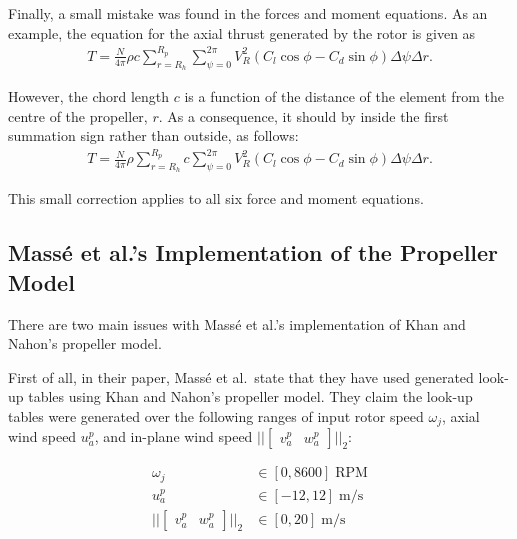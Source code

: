 \documentclass[a4paper,12pt]{article}
\begin{document}
            Finally, a small mistake was found in the forces and moment equations. As an example, the equation for the axial thrust generated by the rotor is given as
            \begin{align}
                T = \frac{N}{4\pi} \rho c \sum_{r=R_h}^{R_p} \sum_{\psi=0}^{2\pi} V_R^2 \left( C_l \cos \phi - C_d \sin \phi \right) \Delta \psi \Delta r.
            \end{align}

            However, the chord length \(c\) is a function of the distance of the element from the centre of the propeller, \(r\). As a consequence, it should by inside the first summation sign rather than outside, as follows:
            \begin{align}
                T = \frac{N}{4\pi} \rho \sum_{r=R_h}^{R_p} c \sum_{\psi=0}^{2\pi} V_R^2 \left( C_l \cos \phi - C_d \sin \phi \right) \Delta \psi \Delta r.
            \end{align}
            
            This small correction applies to all six force and moment equations.


        \subsection{Mass{\'e} et al.'s Implementation of the Propeller Model}

            There are two main issues with Mass{\'e} et al.'s implementation of Khan and Nahon's propeller model.

            First of all, in their paper, Mass{\'e} et al.\ state that they have used generated look-up tables using Khan and Nahon's propeller model. They claim the look-up tables were generated over the following ranges of input rotor speed \(\omega_j\), axial wind speed \(u^p_a\), and in-plane wind speed \( || \begin{bmatrix} v^p_a & w^p_a \end{bmatrix} ||_2  \):

            \begin{align*}
                \omega_j &\in [0,8600] \; \text{RPM}\\
                u^p_a &\in [-12,12] \; \si{\metre\per\second}\\
                || \begin{bmatrix} v^p_a & w^p_a \end{bmatrix} ||_2 &\in [0,20] \; \si{\metre\per\second}
            \end{align*}
\end{document}
